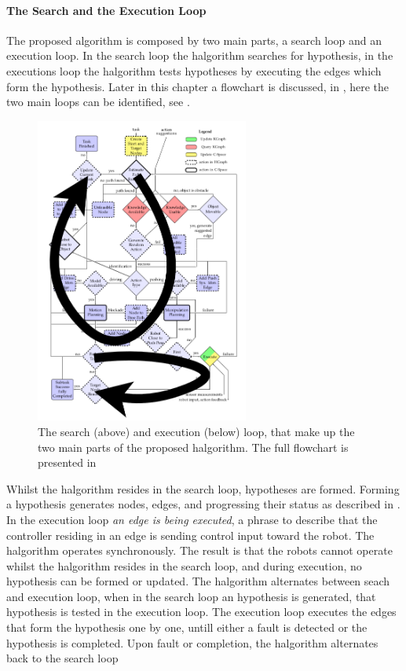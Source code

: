 \paragraph{The Search and the Execution Loop}
The proposed algorithm is composed by two main parts, a search loop and an execution loop. In the search loop the \ac{halgorithm} searches for hypothesis, in the executions loop the \ac{halgorithm} tests hypotheses by executing the edges which form the hypothesis. Later in this chapter a flowchart is discussed, in , here the two main loops can be identified, see .\bs
\begin{figure}[H]
    \centering
    \includegraphics[width=7cm]{figures/proposed_method/two_loops_identified}
    \caption{The search (above) and execution (below) loop, that make up the two main parts of the proposed \ac{halgorithm}. The full flowchart is presented in }%
    \label{fig:two_loops_identified}
\end{figure}

Whilst the \ac{halgorithm} resides in the search loop, hypotheses are formed. Forming a hypothesis generates nodes, edges, and progressing their status as described in . In the execution loop \textit{an edge is being executed}, a phrase to describe that the controller residing in an edge is sending control input toward the robot. The \ac{halgorithm} operates synchronously. The result is that the robots cannot operate whilst the \ac{halgorithm} resides in the search loop, and during execution, no hypothesis can be formed or updated. The \ac{halgorithm} alternates between seach and execution loop, when in the search loop an hypothesis is generated, that hypothesis is tested in the execution loop. The execution loop executes the edges that form the hypothesis one by one, untill either a fault is detected or the hypothesis is completed. Upon fault or completion, the \ac{halgorithm} alternates back to the search loop\bs

